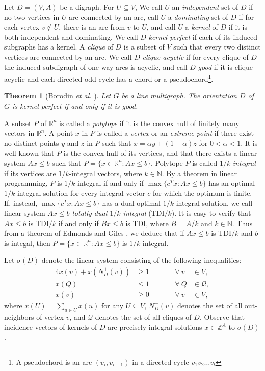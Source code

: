 \documentclass[11pt]{article}
\newtheorem{theorem}{Theorem}%
\numberwithin{theorem}{section}
\begin{document}
Let $D=(V,A)$ be a digraph. 
For $U\subseteq V$, We call $U$ an \textit{independent} set of $D$ if no two vertices in $U$ are connected by an arc, call $U$ a \textit{dominating} set of $D$ if for each vertex $v\not\in U$, there is an arc from $v$ to $U$, and call $U$ a \textit{kernel} of $D$ if it is both independent and dominating. 
We call $D$ \textit{kernel perfect} if each of its induced subgraphs has a kernel.
A \textit{clique} of $D$ is a subset of $V$ such that every two distinct vertices are connected by an arc. We call $D$ \textit{clique-acyclic} if for every clique of $D$ the induced subdigraph of one-way arcs is acyclic, and call $D$ \textit{good} if it is clique-acyclic and each directed odd cycle has a chord or a pseudochord\footnote{A pseudochord is an arc $(v_i,v_{i-1})$ in a directed cycle $v_1 v_2\ldots v_l$}. 

\begin{theorem}[Borodin \textit{et al.} \cite{BoroKost98}]
\label{thm:BoroKost98}
Let $G$ be a line multigraph. The orientation $D$ of $G$ is kernel perfect if and only if it is good.
\end{theorem}

A subset $P$ of $\mathbb{R}^n$ is called a \textit{polytope} if it is the convex hull of finitely many vectors in $\mathbb{R}^n$. A point $x$ in $P$ is called a \textit{vertex} or an \textit{extreme point} if there exist no distinct points $y$ and $z$ in $P$ such that $x=\alpha y+ (1-\alpha)z$ for $0<\alpha<1$. It is well known that $P$ is the convex hull of its vertices, and that there exists a linear system $Ax\leq b$ such that $P=\{x\in\mathbb{R}^n:Ax\leq b\}$. Polytope $P$ is called $1/k$-\textit{integral} if its vertices are $1/k$-integral vectors, where $k\in\mathbb{N}$. By a theorem in linear programming, $P$ is $1/k$-integral if and only if $\max\{c^T x:Ax\leq b\}$ has an optimal $1/k$-integral solution for every integral vector $c$ for which the optimum is finite. If, instead, $\max\{c^T x:Ax\leq b\}$ has a dual optimal $1/k$-integral solution, we call linear system $Ax\leq b$ \textit{totally dual $1/k$-integral} (TDI$/k$).
It is easy to verify that $Ax\leq b$ is TDI$/k$ if and only if $Bx\leq b$ is TDI, where $B=A/k$ and $k\in\mathbb{N}$. Thus from a theorem of Edmonds and Giles \cite{EdmoGile77}, we deduce that if $Ax\leq b$ is TDI$/k$ and $b$ is integal, then $P=\{x\in\mathbb{R}^n:Ax\leq b\}$ is $1/k$-integral.

Let $\sigma(D)$ denote the linear system consisting of the following inequalities:
\begin{alignat}{4}
x(v)+x(N^+_{D}(v)) &\geq 1 &\qquad &\forall ~ v~&\in V, \label{domination constraints}\\
x(Q)&\leq 1 &\qquad &\forall ~ Q &\in \mathcal{Q}, \label{independence constraints}\\
x(v) &\geq 0 &\qquad &\forall ~ v~&\in V, \label{vertex nonnegativity}
\end{alignat}
where $x(U)=\sum_{u\in U}x(u)$ for any $U\subseteq V$, $N_D^+(v)$ denotes the set of all out-neighbors of vertex $v$, and $\mathcal{Q}$ denotes the set of all cliques of $D$. Observe that incidence vectors of kernels of $D$ are precisely integral solutions $x\in \mathbb{Z}^A$ to $\sigma(D)$.
\end{document}
